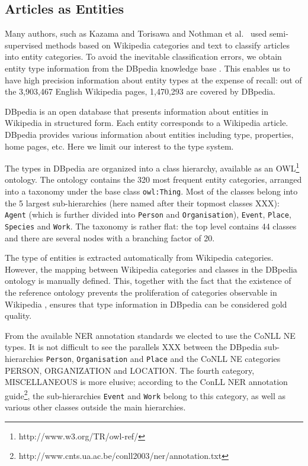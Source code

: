 \documentclass[11pt]{article}
\begin{document}

\subsection{Articles as Entities}
\label{dbpedia}

Many authors, such as Kazama and Torisawa  and Nothman et al.~ used semi-supervised methods based on Wikipedia categories and text to classify articles into entity categories. To avoid the inevitable classification errors, we obtain entity type information from the DBpedia knowledge base \cite{Bizer:09}. This enables us to have high precision information about entity types at the expense of recall: out of the 3,903,467 English Wikipedia pages, 1,470,293 are covered by DBpedia.

DBpedia is an open database that presents information about entities in Wikipedia in structured form. Each entity corresponds to a Wikipedia article. DBpedia provides various information about entities including type, properties, home pages, etc. Here we limit our interest to the type system.

The types in DBpedia are organized into a class hierarchy, available as an OWL\footnote{http://www.w3.org/TR/owl-ref/} ontology. The ontology contains the 320 most frequent entity categories, arranged into a taxonomy under the base class \texttt{owl:Thing}. Most of the classes belong into the 5 largest sub-hierarchies (here named after their topmost classes XXX): \texttt{Agent} (which is further divided into \texttt{Person} and \texttt{Organisation}), \texttt{Event}, \texttt{Place}, \texttt{Species} and \texttt{Work}. The taxonomy is rather flat: the top level contains 44 classes and there are several nodes with a branching factor of 20.

The type of entities is extracted automatically from Wikipedia categories. However, the mapping between Wikipedia categories and classes in the DBpedia ontology is manually defined. This, together with the fact that the existence of the reference ontology prevents the proliferation of categories observable in Wikipedia \cite{Bizer:09}, ensures that type information in DBpedia can be considered gold quality.

From the available NER annotation standards we elected to use the CoNLL \cite{Tjong:03} NE types. It is not difficult to see the parallels XXX between the DBpedia sub-hierarchies \texttt{Person}, \texttt{Organisation} and \texttt{Place} and the CoNLL NE categories PERSON, ORGANIZATION and LOCATION. The fourth category, MISCELLANEOUS is more elusive; according to the ConLL NER annotation guide\footnote{http://www.cnts.ua.ac.be/conll2003/ner/annotation.txt}, the sub-hierarchies \texttt{Event} and \texttt{Work} belong to this category, as well as various other classes outside the main hierarchies. 
\end{document}
